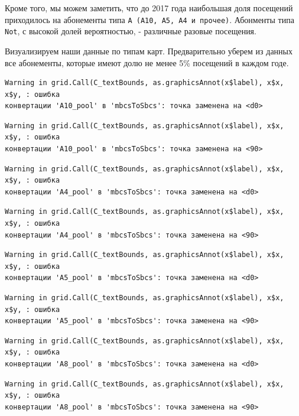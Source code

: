 \documentclass[
  letterpaper,
  DIV=11,
  numbers=noendperiod]{scrreprt}
\begin{document}
Кроме того, мы можем заметить, что до 2017 года наибольшая доля
посещений приходилось на абонементы типа
\texttt{А\ (А10,\ А5,\ А4\ и\ прочее)}. Абонменты типа \texttt{Not}, с
высокой долей вероятностью, - различные разовые посещения.

Визуализируем наши данные по типам карт. Предварительно уберем из данных
все абонементы, которые имеют долю не менее 5\% посещений в каждом годе.

\begin{verbatim}
Warning in grid.Call(C_textBounds, as.graphicsAnnot(x$label), x$x, x$y, : ошибка
конвертации 'А10_pool' в 'mbcsToSbcs': точка заменена на <d0>
\end{verbatim}

\begin{verbatim}
Warning in grid.Call(C_textBounds, as.graphicsAnnot(x$label), x$x, x$y, : ошибка
конвертации 'А10_pool' в 'mbcsToSbcs': точка заменена на <90>
\end{verbatim}

\begin{verbatim}
Warning in grid.Call(C_textBounds, as.graphicsAnnot(x$label), x$x, x$y, : ошибка
конвертации 'А4_pool' в 'mbcsToSbcs': точка заменена на <d0>
\end{verbatim}

\begin{verbatim}
Warning in grid.Call(C_textBounds, as.graphicsAnnot(x$label), x$x, x$y, : ошибка
конвертации 'А4_pool' в 'mbcsToSbcs': точка заменена на <90>
\end{verbatim}

\begin{verbatim}
Warning in grid.Call(C_textBounds, as.graphicsAnnot(x$label), x$x, x$y, : ошибка
конвертации 'А5_pool' в 'mbcsToSbcs': точка заменена на <d0>
\end{verbatim}

\begin{verbatim}
Warning in grid.Call(C_textBounds, as.graphicsAnnot(x$label), x$x, x$y, : ошибка
конвертации 'А5_pool' в 'mbcsToSbcs': точка заменена на <90>
\end{verbatim}

\begin{verbatim}
Warning in grid.Call(C_textBounds, as.graphicsAnnot(x$label), x$x, x$y, : ошибка
конвертации 'А8_pool' в 'mbcsToSbcs': точка заменена на <d0>
\end{verbatim}

\begin{verbatim}
Warning in grid.Call(C_textBounds, as.graphicsAnnot(x$label), x$x, x$y, : ошибка
конвертации 'А8_pool' в 'mbcsToSbcs': точка заменена на <90>
\end{verbatim}
\end{document}
